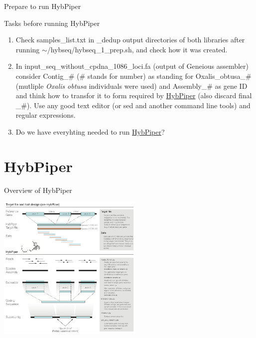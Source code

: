 \documentclass[compress, ucs, xelatex, 11pt, xcolor=x11names, aspectratio=1609,
	hyperref={
		bookmarks=true,
		unicode=true,
		colorlinks=true,
		pdftitle={HybSeq course},
		plainpages=false,
		pdfauthor={Vojtech Zeisek},
		pdfsubject={Practical processing of HybSeq target enrichment sequencing data on computing grids like MetaCentrum},
		pdfcreator={XeLaTeX},
		pdfkeywords={BASH, command line, GNU, HybSeq, Linux, MetaCentrum, sequencing shell, target enrichment},
		linkcolor=Cyan2, %
		anchorcolor=Firebrick2, %
		citecolor=Firebrick2, %
		filecolor=Firebrick2, %
		menucolor=Firebrick2, %
		urlcolor=Chartreuse2, %
		pdftex},
	url={hyphens, lowtilde} %
	]{beamer}
\renewcommand{\texttt}[1]{\colorbox{Snow4}{{\ttfamily #1}}}
\begin{document}
\begin{frame}{Prepare to run HybPiper}
	\begin{exampleblock}{Tasks before running HybPiper}
		\begin{enumerate}
			\item Check \texttt{samples\_list.txt} in \texttt{2\_dedup} output directories of both libraries after running \texttt{$\sim$/hybseq/hybseq\_1\_prep.sh}, and check how it was created.
			\item In \texttt{input\_seq\_without\_cpdna\_1086\_loci.fa} (output of Geneious assembler) consider \texttt{Contig\_\#} (\texttt{\#} stands for number) as standing for \texttt{Oxalis\_obtusa\_\#} (mutliple \textit{Oxalis obtusa} individuals were used) and \texttt{Assembly\_\#} as gene ID and think how to transfor it to form required by \href{https://github.com/mossmatters/HybPiper/wiki\#target-file}{HybPiper} (also discard final \texttt{\_\#}). Use any good text editor (or \texttt{sed} and another command line tools) and regular expressions.
			\item Do we have everyhting needed to run \href{https://github.com/mossmatters/HybPiper}{HybPiper}?
		\end{enumerate}
	\end{exampleblock}
\end{frame}

\section{HybPiper}

\begin{frame}{Overview of HybPiper}
	\begin{center}
		\includegraphics[height=7cm]{hybpiper.png}
	\end{center}
\end{frame}
\end{document}

